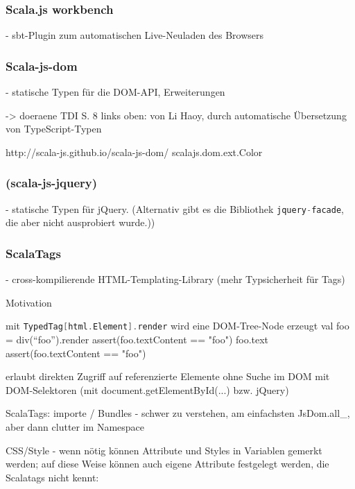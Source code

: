 \documentclass[a4paper, 12pt, hidelinks, listof=totoc, listoftables=totoc, bibliography=totoc]{scrreprt}
\newcommand{\code}[1]{\lstinline[language=Scala, style=inline]|#1|}
\newcommand{\scala}[1]{\lstinline[language=Scala, style=inline]|#1|}
\begin{document}
\subsubsection{Scala.js workbench}

- sbt-Plugin zum automatischen Live-Neuladen des Browsers


\subsubsection{Scala-js-dom}

- statische Typen für die DOM-API, Erweiterungen

-> doeraene TDI S. 8 links oben:
	von Li Haoy, durch automatische Übersetzung von TypeScript-Typen

http://scala-js.github.io/scala-js-dom/
scalajs.dom.ext.Color

\subsubsection{(scala-js-jquery)}

- statische Typen für jQuery. (Alternativ gibt es die Bibliothek \code{jquery-facade}, die aber nicht ausprobiert wurde.))

\subsubsection{ScalaTags}

- cross-kompilierende HTML-Templating-Library (mehr Typsicherheit für Tags)

Motivation



mit \scala{TypedTag[html.Element].render} wird eine DOM-Tree-Node erzeugt
  val foo = div("`foo"').render
  assert(foo.textContent == "foo")
  foo.text
  assert(foo.textContent == "foo")

erlaubt direkten Zugriff auf referenzierte Elemente ohne Suche im DOM mit DOM-Selektoren (mit document.getElementById(...) bzw. jQuery)

ScalaTags: importe / Bundles - schwer zu verstehen, am einfachsten JsDom.all\_, aber dann clutter im Namespace

CSS/Style - wenn nötig können Attribute und Styles in Variablen gemerkt werden; auf diese Weise können auch eigene Attribute festgelegt werden, die Scalatags nicht kennt:
\end{document}
